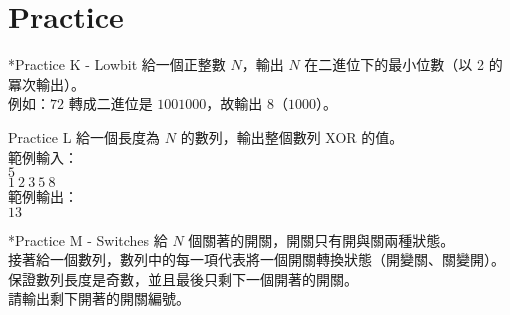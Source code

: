 \documentclass[t]{beamer}
\begin{document}
\section{Practice}
\begin{frame}{*Practice K - Lowbit}
  給一個正整數 $N$，輸出 $N$ 在二進位下的最小位數（以 2 的冪次輸出）。\\
  例如：$72$ 轉成二進位是 $1001000$，故輸出 $8$（$1000$）。
\end{frame}

\begin{frame}{Practice L}
  給一個長度為 $N$ 的數列，輸出整個數列 XOR 的值。\\
  範例輸入：\\
  $5$\\
  $1\ 2\ 3\ 5\ 8$\\
  範例輸出：\\
  $13$
\end{frame}

\begin{frame}{*Practice M - Switches}
  給 $N$ 個關著的開關，開關只有開與關兩種狀態。\\
  接著給一個數列，數列中的每一項代表將一個開關轉換狀態（開變關、關變開）。\\
  保證數列長度是奇數，並且最後只剩下一個開著的開關。\\
  請輸出剩下開著的開關編號。
\end{frame}
\end{document}
